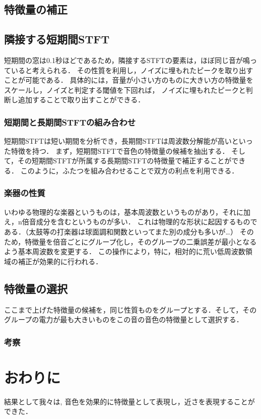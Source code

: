 \documentclass[uplatex,a4paper,11pt]{jsarticle}
\begin{document}
\subsection{特徴量の補正}

\subsection{隣接する短期間STFT}
短期間の窓は0.1秒ほどであるため，隣接するSTFTの要素は，ほぼ同じ音が鳴っていると考えられる．
その性質を利用し，ノイズに埋もれたピークを取り出すことが可能である．
具体的には，音量が小さい方のものに大きい方の特徴量をスケールし，ノイズと判定する閾値を下回れば，
ノイズに埋もれたピークと判断し追加することで取り出すことができる．

\subsubsection{短期間と長期間STFTの組み合わせ}
短期間STFTは短い期間を分析でき，長期間STFTは周波数分解能が高いといった特徴を持つ．
まず，短期間STFTで音色の特徴量の候補を抽出する．
そして，その短期間STFTが所属する長期間STFTの特徴量で補正することができる．
このように，ふたつを組み合わせることで双方の利点を利用できる．

\subsubsection{楽器の性質}
いわゆる物理的な楽器というものは，基本周波数というものがあり，それに加え，n倍音成分を含むというものが多い．
これは物理的な形状に起因するものである．（太鼓等の打楽器は球面調和関数といってまた別の成分も多いが…）
そのため，特徴量を倍音ごとにグループ化し，そのグループの二乗誤差が最小となるよう基本周波数を変更する．
この操作により，特に，相対的に荒い低周波数領域の補正が効果的に行われる．

\subsection{特徴量の選択}
ここまで上げた特徴量の候補を，同じ性質ものをグループとする．そして，そのグループの電力が最も大きいものをこの音の音色の特徴量として選択する．

\subsubsection{考察}


\section{おわりに}
結果として我々は, 音色を効果的に特徴量として表現し，近さを表現することができた．
\end{document}

